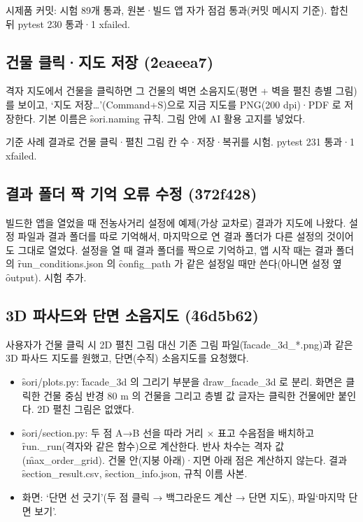\documentclass[10.5pt,a4paper]{article}
\begin{document}
 시제품 커밋: 시험 89개 통과, 원본·빌드 앱 자가 점검 통과(커밋 메시지 기준). 합친 뒤 pytest 230 통과·1 xfailed.

\subsection{건물 클릭·지도 저장 (\f{2eaeea7})}
 격자 지도에서 건물을 클릭하면 그 건물의 벽면 소음지도(평면 + 벽을 펼친 층별 그림)를 보이고, ‘지도 저장…’(Command+S)으로 지금 지도를 PNG(200 dpi)·PDF 로 저장한다. 기본 이름은 \f{sori.naming} 규칙. 그림 안에 AI 활용 고지를 넣었다.

 기준 사례 결과로 건물 클릭·펼친 그림 칸 수·저장·복귀를 시험. pytest 231 통과·1 xfailed.

\subsection{결과 폴더 짝 기억 오류 수정 (\f{372f428})}
 빌드한 앱을 열었을 때 전농사거리 설정에 예제(가상 교차로) 결과가 지도에 나왔다.
 설정 파일과 결과 폴더를 따로 기억해서, 마지막으로 연 결과 폴더가 다른 설정의 것이어도 그대로 열었다.
 설정을 열 때 결과 폴더를 짝으로 기억하고, 앱 시작 때는 결과 폴더의 \f{run\_conditions.json} 의 \f{config\_path} 가 같은 설정일 때만 쓴다(아니면 설정 옆 \f{output}). 시험 추가.

\subsection{3D 파사드와 단면 소음지도 (\f{46d5b62})}
 사용자가 건물 클릭 시 2D 펼친 그림 대신 기존 그림 파일(\f{facade\_3d\_*.png})과 같은 3D 파사드 지도를 원했고, 단면(수직) 소음지도를 요청했다.

\begin{itemize}
\item \f{sori/plots.py}: \f{facade\_3d} 의 그리기 부분을 \f{draw\_facade\_3d} 로 분리. 화면은 클릭한 건물 중심 반경 80 m 의 건물을 그리고 층별 값 글자는 클릭한 건물에만 붙인다. 2D 펼친 그림은 없앴다.
\item \f{sori/section.py}: 두 점 A→B 선을 따라 거리 × 표고 수음점을 배치하고 \f{run.\_run}(격자와 같은 함수)으로 계산한다. 반사 차수는 격자 값(\f{max\_order\_grid}). 건물 안(지붕 아래)·지면 아래 점은 계산하지 않는다. 결과 \f{section\_result.csv}, \f{section\_info.json}, 규칙 이름 사본.
\item 화면: ‘단면 선 긋기’(두 점 클릭 → 백그라운드 계산 → 단면 지도), 파일\menu{}‘마지막 단면 보기’.
\end{itemize}
\end{document}
